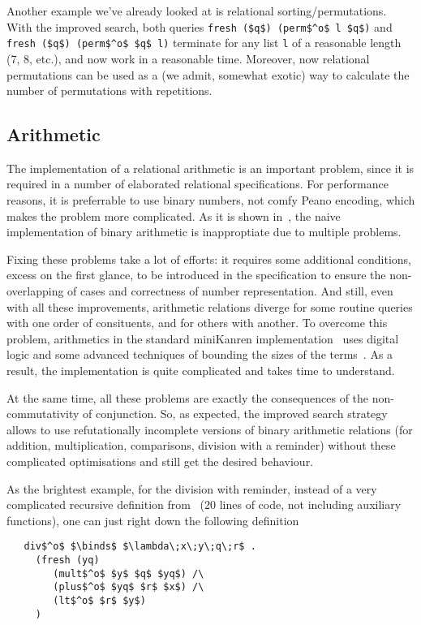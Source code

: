 Another example we've already looked at is relational sorting/permutations. 
With the improved search, both queries \lstinline|fresh ($q$) (perm$^o$ l $q$)| and 
\lstinline|fresh ($q$) (perm$^o$ $q$ l)| terminate for any list \lstinline|l| of a reasonable 
length (7, 8, etc.), and now work in a reasonable time. Moreover, now
relational permutations can be used as a (we admit, somewhat exotic) way to calculate 
the number of permutations with repetitions.

\subsection{Arithmetic}

The implementation of a relational arithmetic is an important problem, since it is required
in a number of elaborated relational specifications. For performance reasons, it is 
preferrable to use binary numbers, not comfy Peano encoding, which makes the problem 
more complicated. As it is shown in~\cite{WillThesis}, the naive implementation of 
binary arithmetic is inapproptiate due to multiple problems. 

Fixing these problems take a lot of efforts: it requires some additional conditions, 
excess on the first glance, to be introduced in the specification to ensure the non-overlapping 
of cases and correctness of number representation. And still, even with all these 
improvements, arithmetic relations diverge for some routine queries with one order of 
consituents, and for others with another. To overcome this problem, 
arithmetics in the standard miniKanren implementation~\cite{TRS} uses digital logic and 
some advanced techniques of bounding the sizes of the terms~\cite{KiselyovArithmetic}. 
As a result, the implementation is quite complicated and takes time to understand.

At the same time, all these problems are exactly the consequences of the non-commutativity 
of conjunction. So, as expected, the improved search 
strategy allows to use refutationally incomplete versions of binary arithmetic relations (for addition, 
multiplication, comparisons, division with a reminder) without these complicated optimisations and still 
get the desired behaviour. 

As the brightest example, for the division with reminder, instead of a very complicated recursive definition 
from~\cite{TRS} (20 lines of code, not including auxiliary functions), one can just right down the 
following definition

\begin{lstlisting}
   div$^o$ $\binds$ $\lambda\;x\;y\;q\;r$ . 
     (fresh (yq)        
        (mult$^o$ $y$ $q$ $yq$) /\
        (plus$^o$ $yq$ $r$ $x$) /\
        (lt$^o$ $r$ $y$)
     )
\end{lstlisting}

